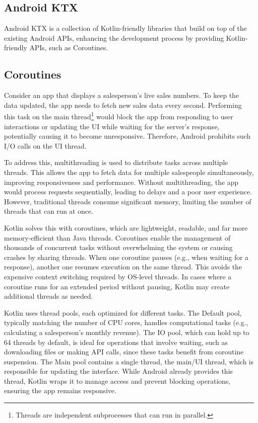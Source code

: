 \documentclass[a4paper,11pt]{article}
\begin{document}
\subsection{Android KTX}
Android KTX is a collection of Kotlin-friendly libraries that build on top of the existing Android APIs, enhancing the development process by providing Kotlin-friendly APIs, such as Coroutines.

\subsection{Coroutines}
Consider an app that displays a salesperson's live sales numbers. To keep the data updated, the app needs to fetch new sales data every second. Performing this task on the main thread\footnote{Threads are independent subprocesses that can run in parallel.} would block the app from responding to user interactions or updating the UI while waiting for the server's response, potentially causing it to become unresponsive. Therefore, Android prohibits such I/O calls on the UI thread.

To address this, multithreading is used to distribute tasks across multiple threads. This allows the app to fetch data for multiple salespeople simultaneously, improving responsiveness and performance. Without multithreading, the app would process requests sequentially, leading to delays and a poor user experience. However, traditional threads consume significant memory, limiting the number of threads that can run at once.

Kotlin solves this with coroutines, which are lightweight, readable, and far more memory-efficient than Java threads. Coroutines enable the management of thousands of concurrent tasks without overwhelming the system or causing crashes by sharing threads. When one coroutine pauses (e.g., when waiting for a response), another one resumes execution on the same thread. This avoids the expensive context switching required by OS-level threads. In cases where a coroutine runs for an extended period without pausing, Kotlin may create additional threads as needed.

Kotlin uses thread pools, each optimized for different tasks. The Default pool, typically matching the number of CPU cores, handles computational tasks (e.g., calculating a salesperson's monthly revenue). The IO pool, which can hold up to 64 threads by default, is ideal for operations that involve waiting, such as downloading files or making API calls, since these tasks benefit from coroutine suspension. The Main pool contains a single thread, the main/UI thread, which is responsible for updating the interface. While Android already provides this thread, Kotlin wraps it to manage access and prevent blocking operations, ensuring the app remains responsive.
\end{document}
